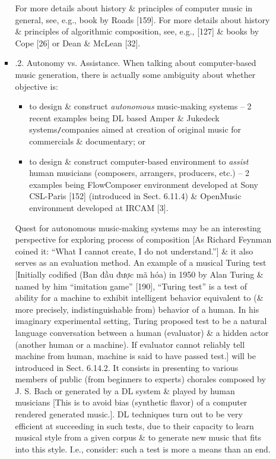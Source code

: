 \documentclass{article}
\begin{document}
\begin{itemize}
\begin{itemize}
\begin{itemize}
			For more details about history \& principles of computer music in general, see, e.g., book by Roads [159]. For more details about history \& principles of algorithmic composition, see, e.g., [127] \& books by Cope [26] or Dean \& McLean [32].
			\item {.2. Autonomy vs. Assistance.} When talking about computer-based music generation, there is actually some ambiguity about whether objective is:
			\begin{itemize}
				\item to design \& construct {\it autonomous} music-making systems -- 2 recent examples being DL based Amper \& Jukedeck systems{\tt/}companies aimed at creation of original music for commercials \& documentary; or
				\item to design \& construct computer-based environment to {\it assist} human musicians (composers, arrangers, producers, etc.) -- 2 examples being FlowComposer environment developed at Sony CSL-Paris [152] (introduced in Sect. 6.11.4) \& OpenMusic environment developed at IRCAM [3].
			\end{itemize}
			Quest for autonomous music-making systems may be an interesting perspective for exploring process of composition [As {\sc Richard Feynman} coined it: ``What I cannot create, I do not understand.''] \& it also serves as an evaluation method. An example of a musical Turing test [Initially codified (Ban đầu được mã hóa) in 1950 by {\sc Alan Turing} \& named by him ``imitation game'' [190], ``Turing test'' is a test of ability for a machine to exhibit intelligent behavior equivalent to (\& more precisely, indistinguishable from) behavior of a human. In his imaginary experimental setting, {\sc Turing} proposed test to be a natural language conversation between a human (evaluator) \& a hidden actor (another human or a machine). If evaluator cannot reliably tell machine from human, machine is said to have passed test.] will be introduced in Sect. 6.14.2. It consists in presenting to various members of public (from beginners to experts) chorales composed by {\sc J. S. Bach} or generated by a DL system \& played by human musicians [This is to avoid bias (synthetic flavor) of a computer rendered generated music.]. DL techniques turn out to be very efficient at succeeding in such tests, due to their capacity to learn musical style from a given corpus \& to generate new music that fits into this style. I.e., consider: such a test is more a means than an end.


\end{itemize}
\end{itemize}
\end{itemize}
\end{document}

